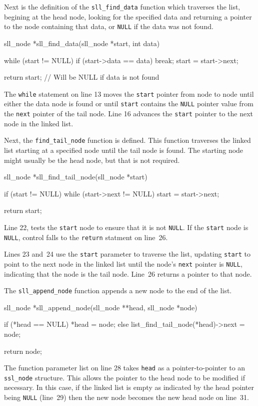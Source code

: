 \documentclass{article}
\begin{document}
  Next is the definition of the \verb|sll_find_data| function which traverses the list, begining at the head node, looking for the specified data and returning a pointer to the node containing that data, or \verb|NULL| if the data was not found.
  \begin{lstc}
sll_node *sll_find_data(sll_node *start, int data) {
  while (start != NULL) {
    if (start->data == data)
      break;
    start = start->next;
  }

  return start; // Will be NULL if data is not found
}\end{lstc}
  The \verb|while| statement on line 13 moves the \verb|start| pointer from node to node until either the data node is found or until \verb|start| contains the \verb|NULL| pointer value from the \verb|next| pointer of the tail node. Line 16 advances the \verb|start| pointer to the next node in the linked list.

  Next, the \verb|find_tail_node| function is defined. This function traverses the linked list starting at a specified node until the tail node is found. The starting node might usually be the head node, but that is not required.
  \begin{lstc}
sll_node *sll_find_tail_node(sll_node *start) {
  if (start != NULL)
    while (start->next != NULL)
      start = start->next;

  return start;
}\end{lstc}
  Line 22, tests the \verb|start| node to ensure that it is not \verb|NULL|. If the \verb|start| node is \verb|NULL|, control falls to the \verb|return| statment on line~26.

  Lines 23 and~24 use the \verb|start| parameter to traverse the list, updating \verb|start| to point to the next node in the linked list until the node's \verb|next| pointer is \verb|NULL|, indicating that the node is the tail node. Line~26 returns a pointer to that node.

  The \verb|sll_append_node| function appends a new node to the end of the list.
  \begin{lstc}
sll_node *sll_append_node(sll_node **head, sll_node *node) {
  if (*head == NULL)
    *head = node;
  else
    list_find_tail_node(*head)->next = node;

  return node;
}\end{lstc}
  The function parameter list on line 28 takes \verb|head| as a pointer-to-pointer to an \verb|ssl_node| structure. This allows the pointer to the head node to be modified if necessary. In this case, if the linked list is empty as indicated by the head pointer being \verb|NULL| (line~29) then the new node becomes the new head node on line~31.
\end{document}

